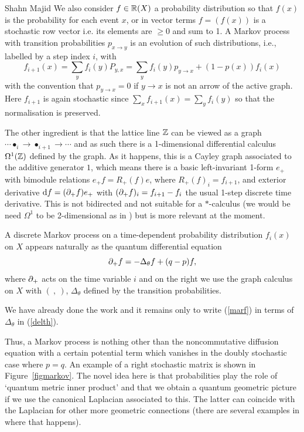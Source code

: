 \begin{artengenv}{Shahn Majid}
We also consider $f\in {\mathbb{R}}(X)$ a probability distribution so that $f(x)$ is the probability for each event $x$, or in vector terms $f=(f(x))$ is a stochastic row vector i.e. its elements are $\ge 0$ and sum to 1. A Markov process with transition probabilities $p_{x\to y}$ is an evolution of such distributions, i.e., labelled by a step index $i$, with
\begin{equation}\label{marf} f_{i+1}(x)= \sum_y f_i(y) P_{y,x}= \sum_{y} f_i(y) p_{y\to x}+ (1-p(x)) f_i(x)\end{equation}
with the convention that $p_{y\to x}=0$ if $y\to x$ is not an arrow of the active graph. Here $f_{i+1}$ is again stochastic since $\sum_x f_{i+1}(x)=\sum_yf_i(y)$ so that the normalisation is preserved. 

The other ingredient is that the lattice line ${\mathbb{Z}}$ can be viewed as a graph $\cdots\bullet_i\to \bullet_{i+1}\to\cdots$ and as such there is a 1-dimensional differential calculus $\Omega^1({\mathbb{Z}})$ defined by the graph. As it happens, this is a Cayley graph associated to the additive generator $1$, which means there is a basic left-invariant 1-form $e_+$ with bimodule relations $e_+ f=R_+(f)e$, where $R_+(f)_i=f_{i+1}$, and exterior derivative ${\rm d} f=({\partial}_+ f)e_+$ with $({\partial}_+f)_i=f_{i+1}-f_i$ the usual 1-step discrete time derivative. This is not bidirected and not suitable for a $*$-calculus (we would be need $\Omega^1$ to be 2-dimensional as in \parencite{Ma:haw}) but is more relevant at the moment. 

\begin{proposition}\label{propmar} A discrete Markov process on a time-dependent probability distribution $f_i(x)$ on $X$ appears naturally as the quantum differential equation
\[ {\partial}_+f= -\Delta_\theta f+ (q-p) f,\] 
where ${\partial}_+$ acts on the time variable $i$ and on the right we use the graph calculus on $X$ with $(\ ,\ )$, $\Delta_\theta$ defined by the transition probabilities.
\end{proposition}
\proof We have already done the work and it remains only to write (\ref{marf}) in terms of $\Delta_\theta$ in (\ref{delth}). \endproof

Thus, a Markov process is nothing other than the noncommutative diffusion equation with a certain potential term which vanishes in the doubly stochastic case where $p=q$. An example of a right stochastic matrix is shown in Figure~\ref{figmarkov}. The novel idea here is that probabilities play the role of `quantum metric inner product' and that we obtain a quantum geometric picture if we use the canonical Laplacian associated to this. The latter can coincide with the Laplacian for other more geometric connections (there are several examples in \parencite{BegMa} where that happens). 


\end{artengenv}
